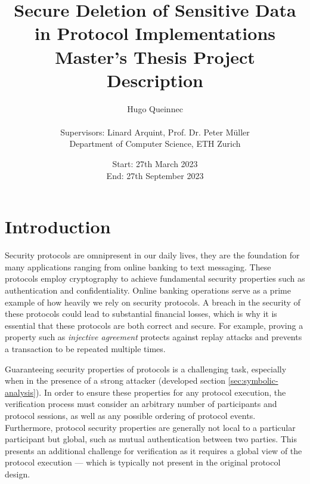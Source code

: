 \documentclass{article}
\title{Secure Deletion of Sensitive Data in Protocol Implementations\\
{\large Master's Thesis Project Description}}
\author{Hugo Queinnec \\ \\ Supervisors: Linard Arquint, Prof. Dr. Peter Müller \\
Department of Computer Science, ETH Zurich}
\date{Start: 27th March 2023 \\
      End: 27th September 2023 \\
      \TODO{Update the dates in the final version.}}
\begin{document}
\maketitle

\thispagestyle{plain}
\pagestyle{plain}


\section{Introduction}

Security protocols are omnipresent in our daily lives, they are the foundation for many applications ranging from online banking to text messaging. These protocols employ cryptography to achieve fundamental security properties such as authentication and confidentiality.
Online banking operations serve as a prime example of how heavily we rely on security protocols. A breach in the security of these protocols could lead to substantial financial losses, which is why it is essential that these protocols are both correct and secure. For example, proving a property such as \textit{injective agreement} protects against replay attacks and prevents a transaction to be repeated multiple times.

Guaranteeing security properties of protocols is a challenging task, especially when in the presence of a strong attacker (developed section \ref*{sec:symbolic-analysis}). In order to ensure these properties for any protocol execution, the verification process must consider an arbitrary number of participants and protocol sessions, as well as any possible ordering of protocol events. Furthermore, protocol security properties are generally not local to a particular participant but global, such as mutual authentication between two parties. This presents an additional challenge for verification as it requires a global view of the protocol execution — which is typically not present in the original protocol design.
\end{document}
